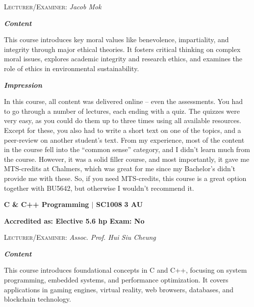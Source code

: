 {\large{\textsc{Lecturer/Examiner:} \textit{Jacob Mok}}} \vspace{0.25cm}

{\large{\textbf{\textit{Content}}}} 
\vspace{-0.25cm}

This course introduces key moral values like benevolence, impartiality, and integrity through major ethical theories. It fosters critical thinking on complex moral issues, explores academic integrity and research ethics, and examines the role of ethics in environmental sustainability.

{\large{\textbf{\textit{Impression}}}}
\vspace{-0.25cm}

In this course, all content was delivered online -- even the assessments. You had to go through a number of lectures, each ending with a quiz. The quizzes were very easy, as you could do them up to three times using all available resources. Except for these, you also had to write a short text on one of the topics, and a peer-review on another student's text. From my experience, most of the content in the course fell into the ``common sense'' category, and I didn't learn much from the course. However, it was a solid filler course, and most importantly, it gave me MTS-credits at Chalmers, which was great for me since my Bachelor's didn't provide me with these. So, if you need MTS-credits, this course is a great option together with BU5642, but otherwise I wouldn't recommend it.

\vspace{-0.4cm}
\hrulefill

\newpage

\vspace{-0.3cm}
\hrulefill

{\large{\textbf{C \& C++ Programming $\vert$ SC1008} \hfill \textbf{3 AU}}}

\vspace{-0.3cm}
\textbf{Accredited as: Elective 5.6 hp \hfill Exam: No}

{\large{\textsc{Lecturer/Examiner:} \textit{Assoc. Prof. Hui Siu Cheung}}} \vspace{0.25cm}

{\large{\textbf{\textit{Content}}}} 
\vspace{-0.25cm}

This course introduces foundational concepts in C and C++, focusing on system programming, embedded systems, and performance optimization. It covers applications in gaming engines, virtual reality, web browsers, databases, and blockchain technology.

